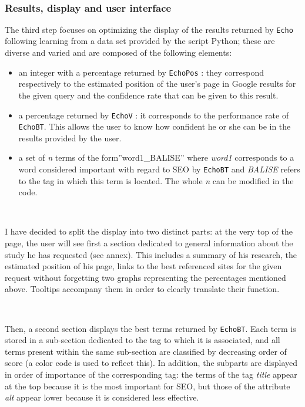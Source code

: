 \documentclass[12pt]{article}
\begin{document}
\

\subsubsection{Results, display and user interface}

The third step focuses on optimizing the display of the results returned by \texttt{Echo} following learning from a data set provided by the script \textsf{Python}; these are diverse and varied and are composed of the following elements:
\begin{itemize}
	\item an integer with a percentage returned by \texttt{EchoPos} : they correspond respectively to the estimated position of the user's page in Google results for the given query and the confidence rate that can be given to this result.
	\item a percentage returned by \texttt{EchoV} : it corresponds to the performance rate of \texttt{EchoBT}. This allows the user to know how confident he or she can be in the results provided by the user.
	\item a set of \textit{n} terms of the form''word1\_BALISE'' where \textit{word1} corresponds to a word considered important with regard to SEO by \texttt{EchoBT} and \textit{BALISE} refers to the tag in which this term is located. The whole \textit{n} can be modified in the code.
\end{itemize}

\

I have decided to split the display into two distinct parts: at the very top of the page, the user will see first a section dedicated to general information about the study he has requested (see annex). This includes a summary of his research, the estimated position of his page, links to the best referenced sites for the given request without forgetting two graphs representing the percentages mentioned above. Tooltips accompany them in order to clearly translate their function.

\

Then, a second section displays the best terms returned by \texttt{EchoBT}. Each term is stored in a sub-section dedicated to the tag to which it is associated, and all terms present within the same sub-section are classified by decreasing order of score (a color code is used to reflect this). In addition, the subparts are displayed in order of importance of the corresponding tag: the terms of the tag \textit{title} appear at the top because it is the most important for SEO, but those of the attribute \textit{alt} appear lower because it is considered less effective.
\end{document}
